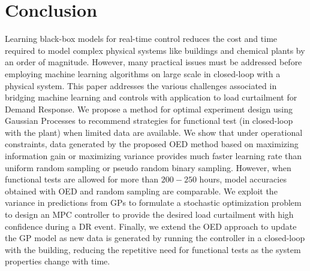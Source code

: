 \section{Conclusion}

Learning black-box models for real-time control reduces the cost and time required to model complex physical systems like buildings and chemical plants by an order of magnitude. 
However, many practical issues must be addressed before employing machine learning algorithms on large scale in closed-loop with a physical system.
This paper addresses the various challenges associated in bridging machine learning and controls with application to load curtailment for Demand Response.
We propose a method for optimal experiment design using Gaussian Processes to recommend strategies for functional test (in closed-loop with the plant) when limited data are available. 
We show that under operational constraints, data generated by the proposed OED method based on maximizing information gain or maximizing variance provides much faster learning rate than uniform random sampling or pseudo random binary sampling. 
However, when functional tests are allowed for more than \(200-250\) hours, model accuracies obtained with OED and random sampling are comparable.
We exploit the variance in predictions from GPs to formulate a stochastic optimization problem to design an MPC controller to provide the desired load curtailment with high confidence during a DR event. 
Finally, we extend the OED approach to update the GP model as new data is generated by running the controller in a closed-loop with the building, reducing the repetitive need for functional tests as the system properties change with time.

